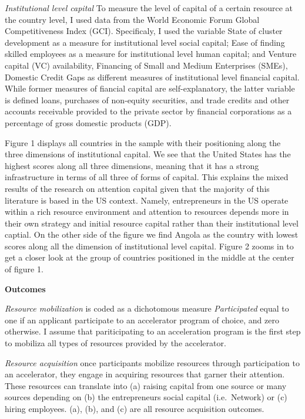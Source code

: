 \documentclass[
  english,
  man]{apa6}
\begin{document}
\emph{Institutional level capital} To measure the level of capital of a certain resource at the country level, I used data from the World Economic Forum Global Competitiveness Index (GCI). Specificaly, I used the variable State of cluster development as a measure for institutional level social capital; Ease of finding skilled employees as a measure for institutional level human capital; and Venture capital (VC) availability, Financing of Small and Medium Enterprises (SMEs), Domestic Credit Gaps as different measures of institutional level financial capital. While former measures of fiancial capital are self-explanatory, the latter variable is defined loans, purchases of non-equity securities, and trade credits and other accounts receivable provided to the private sector by financial corporations as a percentage of gross domestic products (GDP).

Figure 1 displays all countries in the sample with their positioning along the three dimensions of institutional capital. We see that the United States has the highest scores along all three dimensions, meaning that it has a strong infrastructure in terms of all three of forms of capital. This explains the mixed results of the research on attention capital given that the majority of this literature is based in the US context. Namely, entrepreneurs in the US operate within a rich resource environment and attention to resources depends more in their own strategy and initial resource capital rather than their institutional level captial. On the other side of the figure we find Angola as the country with lowest scores along all the dimension of institutional level capital. Figure 2 zooms in to get a closer look at the group of countries positioned in the middle at the center of figure 1.

\textbf{Outcomes}

\emph{Resource mobilization} is coded as a dichotomous measure \emph{Participated} equal to one if an applicant participate to an accelerator program of choice, and zero otherwise. I assume that pariticipating to an acceleration program is the first step to mobiliza all types of resources provided by the accelerator.

\emph{Resource acquisition} once participants mobilize resources through participation to an accelerator, they engage in acquiring resources that garner their attention. These resources can translate into (a) raising capital from one source or many sources depending on (b) the entrepreneurs social capital (i.e.~Network) or (c) hiring employees. (a), (b), and (c) are all resource acquisition outcomes.
\end{document}
